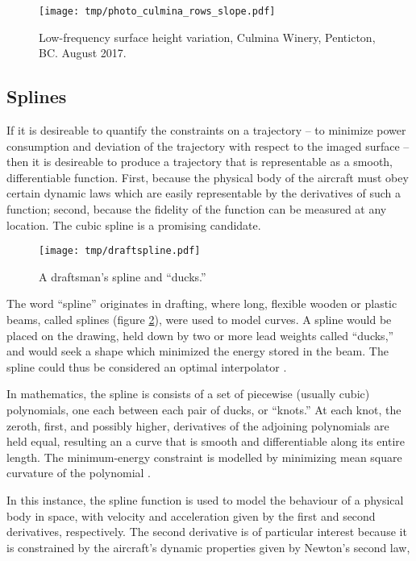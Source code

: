 \documentclass[doc]{apa6}
\begin{document}
\begin{figure} %
\texttt{[image: tmp/photo\_culmina\_rows\_slope.pdf]} 
\caption{Low-frequency surface height variation, Culmina Winery, Penticton, BC. August 2017.}
\label{fig:photo_culmina_rows_slope}
\end{figure}


\subsection{Splines}

If it is desireable to quantify the constraints on a trajectory -- to minimize power consumption and deviation of the trajectory with respect to the imaged surface -- then it is desireable to produce a trajectory that is representable as a smooth, differentiable function. First, because the physical body of the aircraft must obey certain dynamic laws which are easily representable by the derivatives of such a function; second, because the fidelity of the function can be measured at any location. The cubic spline is a promising candidate.

\begin{figure} %
\texttt{[image: tmp/draftspline.pdf]} 
\caption{A draftsman's spline and ``ducks.'' \parencite{DeBoor2006}}
\label{fig:spline}
\end{figure}

The word ``spline'' originates in drafting, where long, flexible wooden or plastic beams, called splines (figure \ref{fig:spline}), were used to model curves. A spline would be placed on the drawing, held down by two or more lead weights called ``ducks,'' and would seek a shape which minimized the energy stored in the beam. The spline could thus be considered an optimal interpolator \parencite{Wegman2016}. 

In mathematics, the spline is consists of a set of piecewise (usually cubic) polynomials, one each between each pair of ducks, or ``knots.'' At each knot, the zeroth, first, and possibly higher, derivatives of the adjoining polynomials are held equal, resulting an a curve that is smooth and differentiable along its entire length. The minimum-energy constraint is modelled by minimizing mean square curvature of the polynomial \parencite{Wegman2016}.

In this instance, the spline function is used to model the behaviour of a physical body in space, with velocity and acceleration given by the first and second derivatives, respectively. The second derivative is of particular interest because it is constrained by the aircraft's dynamic properties given by Newton's second law,
\end{document}
